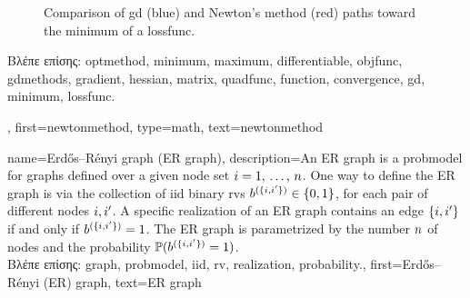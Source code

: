 {{\begin{figure}[H]
		\caption{Comparison of \gls{gd} (blue) and Newton's method (red) paths toward the \gls{minimum} of a \gls{lossfunc}.}
		\end{figure}
		\foreignlanguage{greek}{Βλέπε επίσης:} \gls{optmethod}, \gls{minimum}, \gls{maximum}, \gls{differentiable}, \gls{objfunc}, 
		\gls{gdmethods}, \gls{gradient}, \gls{hessian}, \gls{matrix}, \gls{quadfunc}, \gls{function}, \gls{convergence}, \gls{gd}, 
		\gls{minimum}, \gls{lossfunc}. },
  	first={newtonmethod},
 	type=math,
  	text={newtonmethod} 
}

{name={Erd\H{o}s–R\'enyi graph (ER graph)},
	description={An ER \gls{graph} is a \gls{probmodel} for  \gls{graph}s defined over 
		a given node set $i=1, \,\ldots, \,n$. One way to define the ER \gls{graph} is 
		via the collection of \gls{iid} binary \gls{rv}s $b^{(\{i,i'\})} \in \{0,1\}$, 
		for each pair of different nodes $i, i'$. A specific \gls{realization}  
		of an ER \gls{graph} contains an edge $\{i,i'\}$ if and only if 
		$b^{(\{i,i'\})}=1$. The ER \gls{graph} is parametrized by the 
		number $n$ of nodes and the \gls{probability} $\mathbb{P}({b^{(\{i,i'\})}=1})$. \\
		\foreignlanguage{greek}{Βλέπε επίσης:} \gls{graph}, \gls{probmodel}, \gls{iid}, \gls{rv}, \gls{realization}, \gls{probability}.},
	first={Erd\H{o}s–R\'enyi (ER) graph},
	text={ER graph}
}


